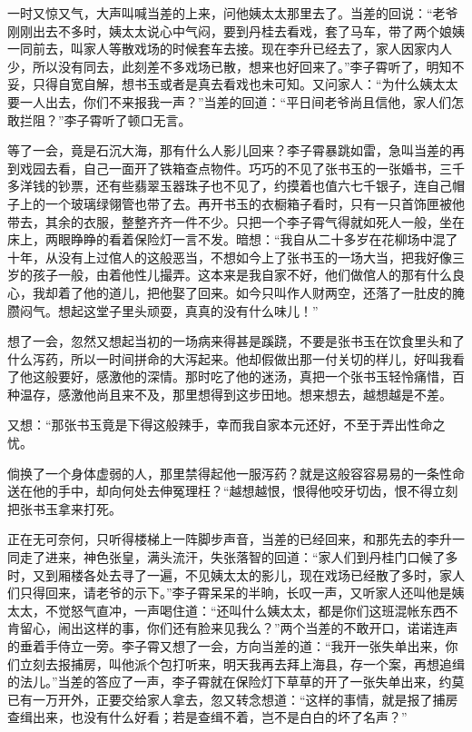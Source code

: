 \documentclass[12pt,UTF8]{ctexbook}
\begin{document}
{{{一时又惊又气，大声叫喊当差的上来，问他姨太太那里去了。当差的回说：“老爷刚刚出去不多时，姨太太说心中气闷，要到丹桂去看戏，套了马车，带了两个娘姨一同前去，叫家人等散戏场的时候套车去接。现在李升已经去了，家人因家内人少，所以没有同去，此刻差不多戏场已散，想来也好回来了。”李子霄听了，明知不妥，只得自宽自解，想书玉或者是真去看戏也未可知。又问家人：“为什么姨太太要一人出去，你们不来报我一声？”当差的回道：“平日间老爷尚且信他，家人们怎敢拦阻？”李子霄听了顿口无言。

等了一会，竟是石沉大海，那有什么人影儿回来？李子霄暴跳如雷，急叫当差的再到戏园去看，自己一面开了铁箱查点物件。巧巧的不见了张书玉的一张婚书，三千多洋钱的钞票，还有些翡翠玉器珠子也不见了，约摸着也值六七千银子，连自己帽子上的一个玻璃绿翎管也带了去。再开书玉的衣橱箱子看时，只有一只首饰匣被他带去，其余的衣服，整整齐齐一件不少。只把一个李子霄气得就如死人一般，坐在床上，两眼睁睁的看着保险灯一言不发。暗想：“我自从二十多岁在花柳场中混了十年，从没有上过倌人的这般恶当，不想如今上了张书玉的一场大当，把我好像三岁的孩子一般，由着他性儿撮弄。这本来是我自家不好，他们做倌人的那有什么良心，我却着了他的道儿，把他娶了回来。如今只叫作人财两空，还落了一肚皮的腌臜闷气。想起这堂子里头顽耍，真真的没有什么味儿！”

想了一会，忽然又想起当初的一场病来得甚是蹊跷，不要是张书玉在饮食里头和了什么泻药，所以一时间拼命的大泻起来。他却假做出那一付关切的样儿，好叫我看了他这般要好，感激他的深情。那时吃了他的迷汤，真把一个张书玉轻怜痛惜，百种温存，感激他尚且来不及，那里想得到这步田地。想来想去，越想越是不差。

又想：“那张书玉竟是下得这般辣手，幸而我自家本元还好，不至于弄出性命之忧。

倘换了一个身体虚弱的人，那里禁得起他一服泻药？就是这般容容易易的一条性命送在他的手中，却向何处去伸冤理枉？“越想越恨，恨得他咬牙切齿，恨不得立刻把张书玉拿来打死。

正在无可奈何，只听得楼梯上一阵脚步声音，当差的已经回来，和那先去的李升一同走了进来，神色张皇，满头流汗，失张落智的回道：“家人们到丹桂门口候了多时，又到厢楼各处去寻了一遍，不见姨太太的影儿，现在戏场已经散了多时，家人们只得回来，请老爷的示下。”李子霄呆呆的半晌，长叹一声，又听家人还叫他是姨太太，不觉怒气直冲，一声喝住道：“还叫什么姨太太，都是你们这班混帐东西不肯留心，闹出这样的事，你们还有脸来见我么？”两个当差的不敢开口，诺诺连声的垂着手侍立一旁。李子霄又想了一会，方向当差的道：“我开一张失单出来，你们立刻去报捕房，叫他派个包打听来，明天我再去拜上海县，存一个案，再想追缉的法儿。”当差的答应了一声，李子霄就在保险灯下草草的开了一张失单出来，约莫已有一万开外，正要交给家人拿去，忽又转念想道：“这样的事情，就是报了捕房查缉出来，也没有什么好看；若是查缉不着，岂不是白白的坏了名声？”

}}}
\end{document}
